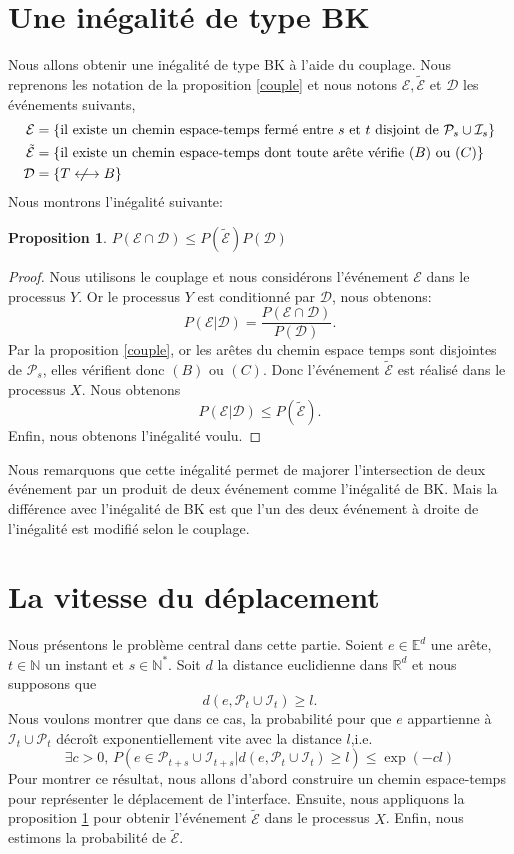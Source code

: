 \documentclass[titlepage,a4paper,12pt]{article}
\newcounter{prop}
\newtheorem{propo}[prop]{Proposition}
\newcommand{\nlongleftrightarrow}{\longleftrightarrow \kern-15pt\not \kern15pt}
\begin{document}
\section{Une inégalité de type BK}
Nous allons obtenir une inégalité de type BK à l'aide du couplage. Nous reprenons les notation de la proposition \ref{couple} et nous notons $\mathcal{E},\tilde{\mathcal{E}}$ et $\mathcal{D}$ les événements suivants,
\begin{align*}
\mathcal{E}&=\{ \text{il existe un chemin espace-temps fermé entre }s \text{ et }t\text{ disjoint de }\mathcal{P}_s\cup \mathcal{I}_s\}\\
\tilde{\mathcal{E}}&=\{ \text{il existe un chemin espace-temps dont toute arête vérifie } (B)\text{ ou }(C) \}\\
\mathcal{D}& = \{T\nlongleftrightarrow B\}
\end{align*}
Nous montrons l'inégalité suivante:
\begin{propo} \label{BK'}
$P(\mathcal{E}\cap\mathcal{D})\leqslant P(\tilde{\mathcal{E}})P(\mathcal{D})$
\end{propo}
\begin{proof}
Nous utilisons le couplage et nous considérons l'événement $\mathcal{E}$ dans le processus $Y$. Or le processus $Y$ est conditionné par $\mathcal{D}$, nous obtenons:
$$P(\mathcal{E}|\mathcal{D}) = \frac{P(\mathcal{E}\cap\mathcal{D})}{P(\mathcal{D})}.
$$
Par la proposition \ref{couple}, or les arêtes du chemin espace temps sont disjointes de $\mathcal{P}_s$, elles vérifient donc $(B)$ ou $(C)$. Donc l'événement $\tilde{\mathcal{E}}$ est réalisé dans le processus $X$. Nous obtenons
$$ P(\mathcal{E}|\mathcal{D})\leqslant P(\tilde{\mathcal{E}}).
$$
Enfin, nous obtenons l'inégalité voulu.
\end{proof}
Nous remarquons que cette inégalité permet de majorer l'intersection de deux événement par un produit de deux événement comme l'inégalité de BK. Mais la différence avec l'inégalité de BK est que l'un des deux événement à droite de l'inégalité est modifié selon le couplage. 
\section{La vitesse du déplacement}
Nous présentons le problème central dans cette partie. Soient $e\in \mathbb{E}^d$ une arête, $t\in \mathbb{N}$ un instant et $s\in \mathbb{N}^*$. Soit $d$ la distance euclidienne dans $\mathbb{R}^d$ et nous supposons que $$d(e,\mathcal{P}_t\cup \mathcal{I}_t) \geqslant l.$$ Nous voulons montrer que dans ce cas, la probabilité pour que $e$ appartienne à $\mathcal{I}_t\cup \mathcal{P}_t$ décroît exponentiellement vite avec la distance $l$,i.e. 
\begin{equation}
\exists c > 0,\, P(e\in \mathcal{P}_{t+s}\cup \mathcal{I}_{t+s}|d(e,\mathcal{P}_t\cup \mathcal{I}_t) \geqslant l)\leqslant \exp(-cl)
\end{equation}
Pour montrer ce résultat, nous allons d'abord construire un chemin espace-temps pour représenter le déplacement de l'interface. Ensuite, nous appliquons la proposition \ref{BK'} pour obtenir l'événement $\tilde{\mathcal{E}}$ dans le processus $X$. Enfin, nous estimons la probabilité de $\tilde{\mathcal{E}}$.
\end{document}
